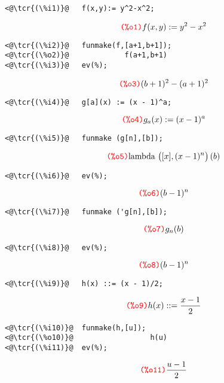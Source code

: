 \documentclass[../Maxima_Workbook.tex]{subfiles}
\begin{document}
\lz \begin{small}
\color{blue} \leqn
\begin{lstlisting}
<@\tcr{(\%i1)}@   f(x,y):= y^2-x^2;
\end{lstlisting}
\vspace{-5.5mm} \[ \tag*{\tcr{\ttfamily (\%o1)}} f(x,y) := y^2-x^2 \]
\vspace{-10.5mm} \begin{lstlisting}
<@\tcr{(\%i2)}@   funmake(f,[a+1,b+1]);
<@\tcr{(\%o2)}@			    f(a+1,b+1)
<@\tcr{(\%i3)}@   ev(%);
\end{lstlisting} 
\vspace{-5.5mm} \[ \tag*{\tcr{\ttfamily (\%o3)}} (b+1)^2 - (a+1)^2 \]
\vspace{-7.5mm} 

\lzz \begin{lstlisting}
<@\tcr{(\%i4)}@   g[a](x) := (x - 1)^a;
\end{lstlisting}
\vspace{-5.5mm} \[ \tag*{\tcr{\ttfamily (\%o4)}} g_a(x):=(x-1)^a \]
\vspace{-10.5mm} \begin{lstlisting}
<@\tcr{(\%i5)}@   funmake (g[n],[b]);
\end{lstlisting}
\vspace{-5.5mm} \[ \tag*{\tcr{\ttfamily (\%o5)}} \text{lambda } \big( [x], (x-1)^n \big) \, (b) \]
\vspace{-10.5mm} \begin{lstlisting}
<@\tcr{(\%i6)}@   ev(%);
\end{lstlisting} 
\vspace{-5.5mm} \[ \tag*{\tcr{\ttfamily (\%o6)}} (b-1)^n \]
\vspace{-10.5mm} \begin{lstlisting}
<@\tcr{(\%i7)}@   funmake ('g[n],[b]);
\end{lstlisting} 
\vspace{-5.5mm} \[ \tag*{\tcr{\ttfamily (\%o7)}} g_n(b) \]
\vspace{-10.5mm} \begin{lstlisting}
<@\tcr{(\%i8)}@   ev(%);
\end{lstlisting} 
\vspace{-5.5mm} \[ \tag*{\tcr{\ttfamily (\%o8)}} (b-1)^n \]
\vspace{-7.5mm} 

\lzz \begin{lstlisting}
<@\tcr{(\%i9)}@   h(x) ::= (x - 1)/2;
\end{lstlisting}
\vspace{-5.5mm} \[ \tag*{\tcr{\ttfamily (\%o9)}} h(x)::= \frac{x-1}{2} \]
\vspace{-5.5mm} \begin{lstlisting}
<@\tcr{(\%i10)}@  funmake(h,[u]);
<@\tcr{(\%o10)}@			      h(u)
<@\tcr{(\%i11)}@  ev(%);
\end{lstlisting}
\vspace{-5.5mm} \[ \tag*{\tcr{\ttfamily (\%o11)}} \frac{u-1}{2} \]
\color{black} \reqn
\end{small}
\vspace{-4mm} 
\end{document}
